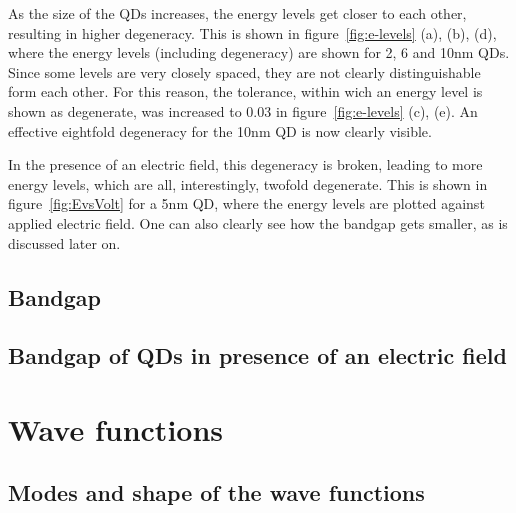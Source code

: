 As the size of the QDs increases, the energy levels get closer to each other, resulting in higher degeneracy. This is shown in figure~\ref{fig:e-levels} (a), (b), (d), where the energy levels (including degeneracy) are shown for 2, 6 and 10nm QDs. Since some levels are very closely spaced, they are not clearly distinguishable form each other. For this reason, the tolerance, within wich an energy level is shown as degenerate, was increased to 0.03 in figure~\ref{fig:e-levels} (c), (e). An effective eightfold degeneracy for the 10nm QD is now clearly visible.
	
In the presence of an electric field, this degeneracy is broken, leading to more energy levels, which are all, interestingly, twofold degenerate. This is shown in figure~\ref{fig:EvsVolt} for a 5nm QD, where the energy levels are plotted against applied electric field. One can also clearly see how the bandgap gets smaller, as is discussed later on.
\FloatBarrier
\subsection{Bandgap} 

\subsection{Bandgap of QDs in presence of an electric field}

\section{Wave functions}
\subsection{Modes and shape of the wave functions}
